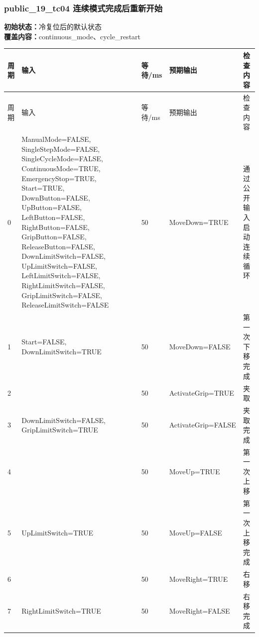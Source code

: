 \subsubsection{{\ttfamily public\_19\_tc04} 连续模式完成后重新开始}

\noindent\textbf{初始状态：}冷复位后的默认状态\\

\textbf{覆盖内容：}continuous\_mode、cycle\_restart

\begin{longtable}{L{1.0cm}L{4.7cm}L{1.4cm}L{4.0cm}L{2.1cm}}

\toprule

周期 & 输入 & 等待/ms & 预期输出 & 检查内容\\

\midrule

\endfirsthead

\toprule

周期 & 输入 & 等待/ms & 预期输出 & 检查内容\\

\midrule

\endhead

0 & ManualMode=FALSE, SingleStepMode=FALSE, SingleCycleMode=FALSE, ContinuousMode=TRUE, EmergencyStop=TRUE, Start=TRUE, DownButton=FALSE, UpButton=FALSE, LeftButton=FALSE, RightButton=FALSE, GripButton=FALSE, ReleaseButton=FALSE, DownLimitSwitch=FALSE, UpLimitSwitch=FALSE, LeftLimitSwitch=FALSE, RightLimitSwitch=FALSE, GripLimitSwitch=FALSE, ReleaseLimitSwitch=FALSE & 50 & MoveDown=TRUE & 通过公开输入启动连续循环\\

1 & Start=FALSE, DownLimitSwitch=TRUE & 50 & MoveDown=FALSE & 第一次下移完成\\

2 &  & 50 & ActivateGrip=TRUE & 夹取\\

3 & DownLimitSwitch=FALSE, GripLimitSwitch=TRUE & 50 & ActivateGrip=FALSE & 夹取完成\\

4 &  & 50 & MoveUp=TRUE & 第一次上移\\

5 & UpLimitSwitch=TRUE & 50 & MoveUp=FALSE & 第一次上移完成\\

6 &  & 50 & MoveRight=TRUE & 右移\\

7 & RightLimitSwitch=TRUE & 50 & MoveRight=FALSE & 右移完成\\


\end{longtable}
